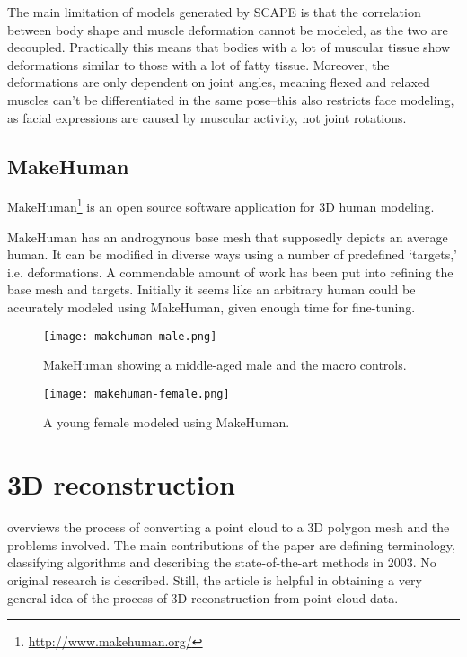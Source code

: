 The main limitation of models generated by SCAPE is that the correlation between body shape and muscle deformation cannot be modeled, as the two are decoupled. Practically this means that bodies with a lot of muscular tissue show deformations similar to those with a lot of fatty tissue. Moreover, the deformations are only dependent on joint angles, meaning flexed and relaxed muscles can't be differentiated in the same pose--this also restricts face modeling, as facial expressions are caused by muscular activity, not joint rotations. \citep{anguelov2005scape}

\citep{baek2012parametric}


\subsection{MakeHuman}


MakeHuman\footnote{\url{http://www.makehuman.org/}} is an open source software application for 3D human modeling.

MakeHuman has an androgynous base mesh that supposedly depicts an average human. It can be modified in diverse ways using a number of predefined `targets,' i.e. deformations. A commendable amount of work has been put into refining the base mesh and targets. Initially it seems like an arbitrary human could be accurately modeled using MakeHuman, given enough time for fine-tuning.

\begin{figure}
    \centering
    \texttt{[image: makehuman-male.png]}
    \caption{MakeHuman showing a middle-aged male and the macro controls.}
    \label{fig:makehuman-male}
\end{figure}

\begin{figure}
    \centering
    \texttt{[image: makehuman-female.png]}
    \caption{A young female modeled using MakeHuman.}
    \label{fig:makehuman-female}
\end{figure}

\section{3D reconstruction}

\citet{fabio2003point} overviews the process of converting a point cloud to a 3D polygon mesh and the problems involved. The main contributions of the paper are defining terminology, classifying algorithms and describing the state-of-the-art methods in 2003. No original research is described. Still, the article is helpful in obtaining a very general idea of the process of 3D reconstruction from point cloud data.

